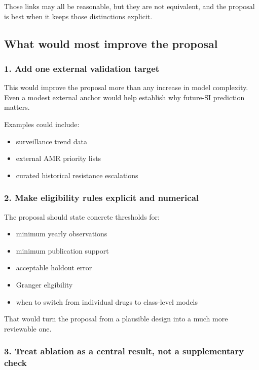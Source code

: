 Those links may all be reasonable, but they are not equivalent, and the
proposal is best when it keeps those distinctions explicit.

\subsection{What would most improve the
proposal}\label{what-would-most-improve-the-proposal}

\subsubsection{1. Add one external validation
target}\label{add-one-external-validation-target}

This would improve the proposal more than any increase in model
complexity. Even a modest external anchor would help establish why
future-SI prediction matters.

Examples could include:

\begin{itemize}
\tightlist
\item
  surveillance trend data
\item
  external AMR priority lists
\item
  curated historical resistance escalations
\end{itemize}

\subsubsection{2. Make eligibility rules explicit and
numerical}\label{make-eligibility-rules-explicit-and-numerical}

The proposal should state concrete thresholds for:

\begin{itemize}
\tightlist
\item
  minimum yearly observations
\item
  minimum publication support
\item
  acceptable holdout error
\item
  Granger eligibility
\item
  when to switch from individual drugs to class-level models
\end{itemize}

That would turn the proposal from a plausible design into a much more
reviewable one.

\subsubsection{3. Treat ablation as a central result, not a
supplementary
check}\label{treat-ablation-as-a-central-result-not-a-supplementary-check}

